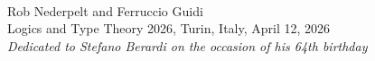 \begin{slide}\begin{center}

\hbox{}\vspace{6\bigskipamount}

\\[2\bigskipamount]

Rob Nederpelt and Ferruccio Guidi\\[\bigskipamount]

\LARGE{Logics and Type Theory 2026, Turin, Italy, April 12, 2026}\\[2\bigskipamount]

\Large{\emph{Dedicated to Stefano Berardi on the occasion of his 64th birthday}}

\end{center}\end{slide}

